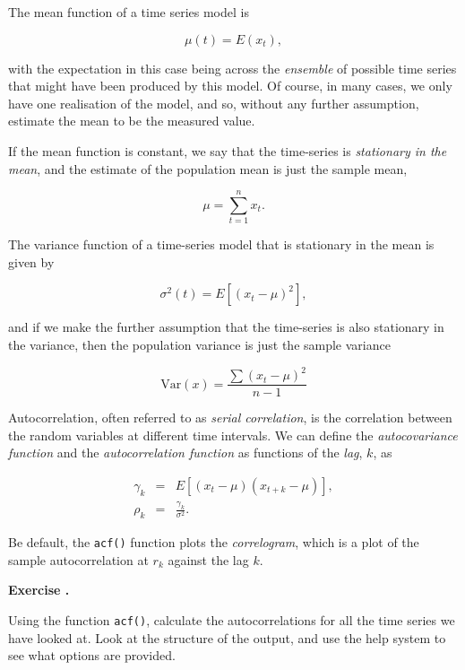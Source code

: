 \documentclass[10pt, a4paper]{article}
\newcounter{wssection}
\newcounter{wsexercise}[wssection]
\newcommand{\worksheetexercise}{
\stepcounter{wsexercise}
\vspace{5mm} \noindent \textbf{Exercise \thewssection.\thewsexercise \;}
}
\begin{document}
\noindent
The mean function of a time series model is

\begin{equation}
\mu(t) = E(x_t),
\end{equation}

\noindent
with the expectation in this case being across the \emph{ensemble} of
possible time series that might have been produced by this model. Of
course, in many cases, we only have one realisation of the model, and
so, without any further assumption, estimate the mean to be the
measured value.

If the mean function is constant, we say that the time-series is
\emph{stationary in the mean}, and the estimate of the population mean
is just the sample mean,

\begin{equation}
\mu = \sum^n_{t=1} x_t.
\end{equation}

\noindent
The variance function of a time-series model that is stationary in the
mean is given by

\begin{equation}
\sigma^2(t) = E[(x_t - \mu)^2],
\end{equation}

\noindent
and if we make the further assumption that the time-series is also
stationary in the variance, then the population variance is just the
sample variance

\begin{equation}
\text{Var}(x) = \frac{\sum(x_t - \mu)^2}{n - 1}
\end{equation}

\noindent
Autocorrelation, often referred to as \emph{serial correlation}, is
the correlation between the random variables at different time
intervals. We can define the \emph{autocovariance function} and the
\emph{autocorrelation function} as functions of the \emph{lag}, $k$, as

\begin{eqnarray}
\gamma_k &=& E[(x_t - \mu)(x_{t+k} - \mu)], \\
\rho_k   &=& \frac{\gamma_k}{\sigma^2}.
\end{eqnarray}

\noindent
Be default, the \texttt{acf()} function plots the \emph{correlogram},
which is a plot of the sample autocorrelation at $r_k$ against the lag
$k$.

\worksheetexercise
Using the function \texttt{acf()}, calculate the autocorrelations for
all the time series we have looked at. Look at the structure of the
output, and use the help system to see what options are provided.
\end{document}
